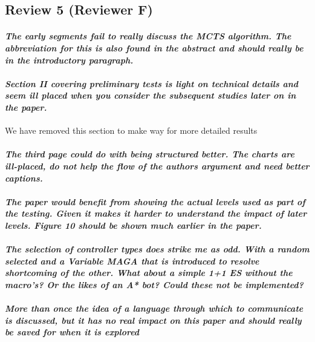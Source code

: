 \documentclass{article}
\begin{document}
\subsection{Review 5 (Reviewer F)}
\paragraph*{\textit{The early segments fail to really discuss the MCTS algorithm.  The abbreviation for this is also found in the abstract and should really be in the introductory paragraph.}}
\paragraph*{\textit{Section II covering preliminary tests is light on technical details and seem ill placed when you consider the subsequent studies later on in the paper.}}
We have removed this section to make way for more detailed results
\paragraph*{\textit{The third page could do with being structured better.  The charts are ill-placed, do not help the flow of the authors argument and need better captions.}}
\paragraph*{\textit{The paper would benefit from showing the actual levels used as part of the testing.  Given it makes it harder to understand the impact of later levels.  Figure 10 should be shown much earlier in the paper.}}
\paragraph*{\textit{The selection of controller types does strike me as odd.  With a random selected and a Variable MAGA that is introduced to resolve shortcoming of the other.  What about a simple 1+1 ES without the macro's?  Or the likes of an A* bot?  Could these not be implemented?}}
\paragraph*{\textit{More than once the idea of a language through which to communicate is discussed, but it has no real impact on this paper and should really be saved for when it is explored}}



\end{document}

